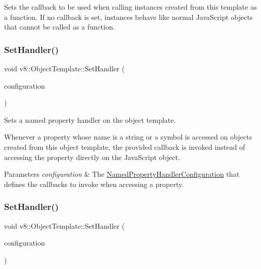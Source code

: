 Sets the callback to be used when calling instances created from this template as a function. If no callback is set, instances behave like normal Java\+Script objects that cannot be called as a function. \mbox{\label{classv8_1_1ObjectTemplate_a3d5666f1e9b0f46df6b4dbb7cfbb6114}} 
\subsubsection{\texorpdfstring{Set\+Handler()}{SetHandler()}\hspace{0.1cm}{\footnotesize\ttfamily [1/2]}}
{\footnotesize\ttfamily void v8\+::\+Object\+Template\+::\+Set\+Handler (\begin{DoxyParamCaption}\item[{const \mbox{\hyperlink{structv8_1_1NamedPropertyHandlerConfiguration}{Named\+Property\+Handler\+Configuration}} \&}]{configuration }\end{DoxyParamCaption})}

Sets a named property handler on the object template.

Whenever a property whose name is a string or a symbol is accessed on objects created from this object template, the provided callback is invoked instead of accessing the property directly on the Java\+Script object.


\begin{DoxyParams}{Parameters}
{\em configuration} & The \mbox{\hyperlink{structv8_1_1NamedPropertyHandlerConfiguration}{Named\+Property\+Handler\+Configuration}} that defines the callbacks to invoke when accessing a property. \\
\hline
\end{DoxyParams}
\mbox{\label{classv8_1_1ObjectTemplate_abc92c2889776a5a1ef6831f9c3da3783}} 
\subsubsection{\texorpdfstring{Set\+Handler()}{SetHandler()}\hspace{0.1cm}{\footnotesize\ttfamily [2/2]}}
{\footnotesize\ttfamily void v8\+::\+Object\+Template\+::\+Set\+Handler (\begin{DoxyParamCaption}\item[{const \mbox{\hyperlink{structv8_1_1IndexedPropertyHandlerConfiguration}{Indexed\+Property\+Handler\+Configuration}} \&}]{configuration }\end{DoxyParamCaption})}

